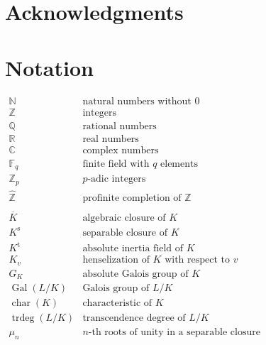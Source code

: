 \section{Acknowledgments}

\clearpage

\section{Notation}

$\begin{array}{ll}
\mathbb{N} & \text{natural numbers without $0$} \\
\mathbb{Z} & \text{integers}\\
\mathbb{Q} & \text{rational numbers}\\
\mathbb{R} & \text{real numbers}\\
\mathbb{C} & \text{complex numbers}\\
\mathbb{F}_q & \text{finite field with $q$ elements}\\
\mathbb{Z}_p & \text{$p$-adic integers}\\
\widehat{\mathbb{Z}} & \text{profinite completion of $\mathbb{Z}$}\\
\\
\overline{K} & \text{algebraic closure of $K$}\\
K^\text{s} & \text{separable closure of $K$}\\
K^\text{t} & \text{absolute inertia field of $K$}\\
K_v & \text{henselization of $K$ with respect to $v$}\\
G_K & \text{absolute Galois group of $K$}\\
\operatorname{Gal}(L/K) & \text{Galois group of $L/K$}\\
\operatorname{char}(K) & \text{characteristic of $K$}\\
\operatorname{trdeg}(L/K) & \text{transcendence degree of $L/K$}\\
\mu_n & \text{$n$-th roots of unity in a separable closure}
\end{array}$